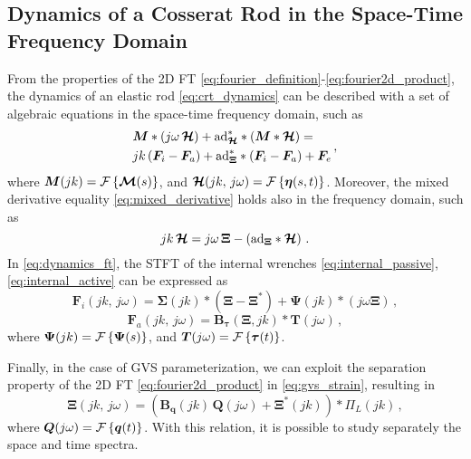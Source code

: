 \subsection{Dynamics of a Cosserat Rod in the Space-Time Frequency Domain} \label{space_time_ft:dynamics_stft}
From the properties of the 2D \ac{FT} \eqref{eq:fourier_definition}-\eqref{eq:fourier2d_product}, the dynamics of an elastic rod \eqref{eq:crt_dynamics} can be described with a set of algebraic equations in the space-time frequency domain, such as
\begin{equation} \label{eq:dynamics_ft}
    \begin{split}
        &\bm{M} \ast \left(j \omega \, \bm{\mathcal{H}}\right) + \textnormal{ad}_{\bm{\mathcal{H}}}^{*} \ast \left(\bm{M} \ast \bm{\mathcal{H}}\right) = \\
        &jk \left(\bm{F}_i - \bm{F}_a\right) + \textnormal{ad}_{\bm{\Xi}}^{*} \ast \left(\bm{F}_i - \bm{F}_a\right) + \bm{F}_e
    \end{split} \, ,
\end{equation}
where $\bm{M}(jk) = \mathcal{F}\left\{\bm{\mathcal{M}}(s)\right\}$, and $\bm{\mathcal{H}}(jk, \, j \omega) = \mathcal{F}\left\{\bm{\eta}(s, t)\right\}$.
Moreover, the mixed derivative equality \eqref{eq:mixed_derivative} holds also in the frequency domain, such as 
\begin{equation} \label{eq:mixed_derivative_ft}
    jk \, \bm{\mathcal{H}} = j \omega \, \bm{\Xi} - \left(\textnormal{ad}_{\bm{\Xi}} \ast \bm{\mathcal{H}}\right) \, .
\end{equation}
In \eqref{eq:dynamics_ft}, the \ac{STFT} of the internal wrenches \eqref{eq:internal_passive}, \eqref{eq:internal_active} can be expressed as
\begin{equation} \label{eq:internal_passive_ft}
    \bm{F}_i(j k , \, j \omega) = \bm{\Sigma}(jk) \ast \left(\bm{\Xi} - \bm{\Xi}^{*}\right) + \bm{\Psi}(jk) \ast \left(j \omega \bm{\Xi}\right) \, ,
\end{equation}
\begin{equation} \label{eq:internal_active_ft}
    \bm{F}_a\left(jk, \, j \omega\right) = \bm{B}_{\bm{\tau}}\left(\bm{\Xi}, jk\right) \ast \bm{T}(j \omega) \, ,
\end{equation}
where $\bm{\Psi}(jk) = \mathcal{F}\left\{\bm{\Psi}(s)\right\}$, and $\bm{T}(j \omega) = \mathcal{F}\left\{\bm{\tau}(t)\right\}$.

Finally, in the case of \ac{GVS} parameterization, we can exploit the separation property of the 2D \ac{FT} \eqref{eq:fourier2d_product} in \eqref{eq:gvs_strain}, resulting in
\begin{equation} \label{eq:gvs_stft}
    \bm{\Xi}(jk, \, j\omega) = \left(\bm{B}_{\bm{q}}\left(jk\right) \, \bm{Q}(j \omega) + \bm{\Xi}^{*}(jk)\right) \ast \Pi_{L}\left(    jk \right) \, ,
\end{equation}
where $\bm{Q}(j \omega) = \mathcal{F}\left\{\bm{q}(t)\right\}$. 
With this relation, it is possible to study separately the space and time spectra.